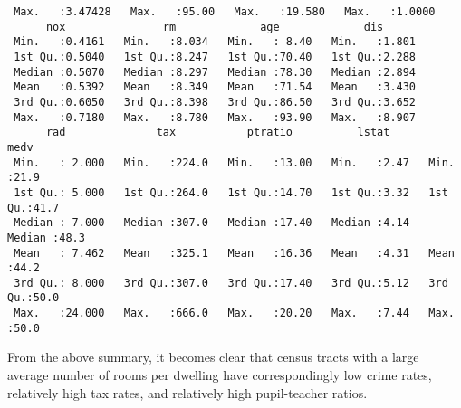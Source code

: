\begin{itemize}
\begin{verbatim}
 Max.   :3.47428   Max.   :95.00   Max.   :19.580   Max.   :1.0000
      nox               rm             age             dis
 Min.   :0.4161   Min.   :8.034   Min.   : 8.40   Min.   :1.801
 1st Qu.:0.5040   1st Qu.:8.247   1st Qu.:70.40   1st Qu.:2.288
 Median :0.5070   Median :8.297   Median :78.30   Median :2.894
 Mean   :0.5392   Mean   :8.349   Mean   :71.54   Mean   :3.430
 3rd Qu.:0.6050   3rd Qu.:8.398   3rd Qu.:86.50   3rd Qu.:3.652
 Max.   :0.7180   Max.   :8.780   Max.   :93.90   Max.   :8.907
      rad              tax           ptratio          lstat           medv
 Min.   : 2.000   Min.   :224.0   Min.   :13.00   Min.   :2.47   Min.   :21.9
 1st Qu.: 5.000   1st Qu.:264.0   1st Qu.:14.70   1st Qu.:3.32   1st Qu.:41.7
 Median : 7.000   Median :307.0   Median :17.40   Median :4.14   Median :48.3
 Mean   : 7.462   Mean   :325.1   Mean   :16.36   Mean   :4.31   Mean   :44.2
 3rd Qu.: 8.000   3rd Qu.:307.0   3rd Qu.:17.40   3rd Qu.:5.12   3rd Qu.:50.0
 Max.   :24.000   Max.   :666.0   Max.   :20.20   Max.   :7.44   Max.   :50.0
    \end{verbatim}
    From the above summary, it becomes clear that census tracts with a large 
    average number of rooms per dwelling have correspondingly low crime rates,
    relatively high tax rates, and relatively high pupil-teacher ratios.
\end{itemize}
